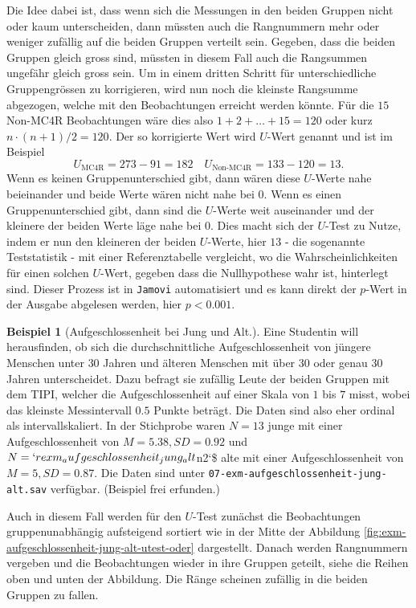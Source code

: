 \documentclass[
]{book}
\theoremstyle{definition}
\theoremstyle{definition}
\newtheorem{example}{Beispiel}[chapter]
\theoremstyle{definition}
\theoremstyle{definition}
\theoremstyle{remark}
\begin{document}
Die Idee dabei ist, dass wenn sich die Messungen in den beiden Gruppen
nicht oder kaum unterscheiden, dann müssten auch die Rangnummern mehr
oder weniger zufällig auf die beiden Gruppen verteilt sein. Gegeben,
dass die beiden Gruppen gleich gross sind, müssten in diesem Fall auch
die Rangsummen ungefähr gleich gross sein. Um in einem dritten Schritt
für unterschiedliche Gruppengrössen zu korrigieren, wird nun noch die
kleinste Rangsumme abgezogen, welche mit den Beobachtungen erreicht
werden könnte. Für die \(15\) Non-MC4R Beobachtungen wäre dies also
\(1+2+\ldots+ 15 = 120\) oder kurz \(n\cdot (n+1)/2 = 120\). Der so
korrigierte Wert wird \(U\)-Wert genannt und ist im Beispiel
\[U_\text{MC4R} = 273 - 91 = 182 \quad U_\text{Non-MC4R} = 133-120 = 13.\]
Wenn es keinen Gruppenunterschied gibt, dann wären diese \(U\)-Werte nahe
beieinander und beide Werte wären nicht nahe bei \(0\). Wenn es einen
Gruppenunterschied gibt, dann sind die \(U\)-Werte weit auseinander und
der kleinere der beiden Werte läge nahe bei \(0\). Dies macht sich der
\(U\)-Test zu Nutze, indem er nun den kleineren der beiden \(U\)-Werte, hier
\(13\) - die sogenannte Teststatistik - mit einer Referenztabelle
vergleicht, wo die Wahrscheinlichkeiten für einen solchen \(U\)-Wert,
gegeben dass die Nullhypothese wahr ist, hinterlegt sind. Dieser Prozess
ist in \texttt{Jamovi} automatisiert und es kann direkt der \(p\)-Wert in der
Ausgabe abgelesen werden, hier \(p < 0.001\).

\begin{example}[Aufgeschlossenheit bei Jung und Alt.]
\protect\hypertarget{exm:aufgeschlossenheit-jung-alt}{}\label{exm:aufgeschlossenheit-jung-alt}Eine Studentin will herausfinden, ob sich die durchschnittliche
Aufgeschlossenheit von jüngere Menschen unter \(30\) Jahren und älteren
Menschen mit über \(30\) oder genau \(30\) Jahren unterscheidet. Dazu
befragt sie zufällig Leute der beiden Gruppen mit dem TIPI, welcher die
Aufgeschlossenheit auf einer Skala von \(1\) bis \(7\) misst, wobei das
kleinste Messintervall \(0.5\) Punkte beträgt. Die Daten sind also eher
ordinal als intervallskaliert. In der Stichprobe waren
\(N = 13\) junge mit einer Aufgeschlossenheit von \(M = 5.38, SD = 0.92\) und \(N =`r
exm_aufgeschlossenheit_jung_alt\)n2`\$ alte mit einer Aufgeschlossenheit
von \(M = 5, SD = 0.87\). Die Daten sind unter
\texttt{07-exm-aufgeschlossenheit-jung-alt.sav} verfügbar.
(Beispiel frei erfunden.)
\end{example}

Auch in diesem Fall werden für den \(U\)-Test zunächst die Beobachtungen
gruppenunabhängig aufsteigend sortiert wie in der Mitte der Abbildung
\ref{fig:exm-aufgeschlossenheit-jung-alt-utest-oder} dargestellt.
Danach werden Rangnummern vergeben und die Beobachtungen wieder in ihre
Gruppen geteilt, siehe die Reihen oben und unten der Abbildung. Die
Ränge scheinen zufällig in die beiden Gruppen zu fallen.
\end{document}
